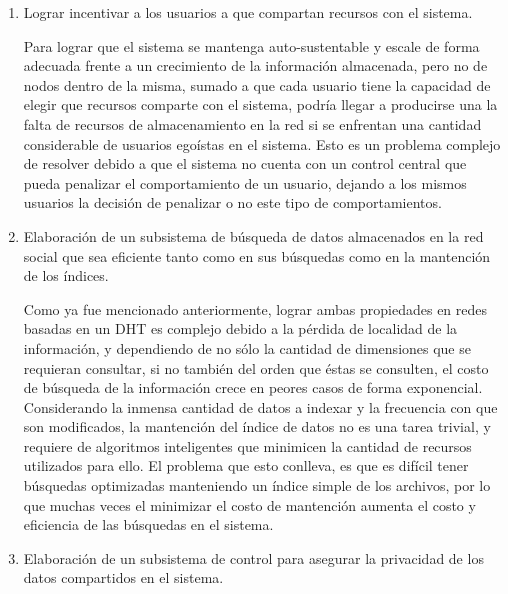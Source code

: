 \begin{enumerate}
    \item Lograr incentivar a los usuarios a que compartan recursos con el sistema.

    Para lograr que el sistema se mantenga auto-sustentable y escale de forma
    adecuada frente a un crecimiento de la información almacenada, pero no de nodos
    dentro de la misma, sumado a que cada usuario tiene la capacidad de elegir
    que recursos comparte con el sistema, podría llegar a producirse una la falta de recursos de
    almacenamiento en la red si se enfrentan una cantidad considerable de
    usuarios egoístas en el sistema. Esto es un problema complejo de resolver
    debido a que el sistema no cuenta con un control central que pueda penalizar el
    comportamiento de un usuario, dejando a los mismos usuarios la decisión de
    penalizar o no este tipo de comportamientos. 

    \item Elaboración de un subsistema de búsqueda de datos almacenados en la
    red social que sea eficiente tanto como en sus búsquedas como en la mantención
    de los índices.

    Como ya fue mencionado anteriormente, lograr ambas propiedades en redes
    basadas en un DHT es complejo debido a la pérdida de localidad de la
    información, y dependiendo de no sólo la cantidad de dimensiones que se
    requieran consultar, si no también del orden que éstas se consulten, el costo
    de búsqueda de la información crece en peores casos de forma exponencial.
    Considerando la inmensa cantidad de datos a indexar y la frecuencia con que
    son modificados, la mantención del índice de datos no es una tarea trivial,
    y requiere de algoritmos inteligentes que minimicen la cantidad de recursos
    utilizados para ello. El problema que esto conlleva, es que es difícil
    tener búsquedas optimizadas manteniendo un índice simple de los archivos,
    por lo que muchas veces el minimizar el costo de mantención aumenta el costo y
    eficiencia de las búsquedas en el sistema.
    \item Elaboración de un subsistema de control para asegurar la privacidad de los datos compartidos en el sistema.
    


\end{enumerate}
